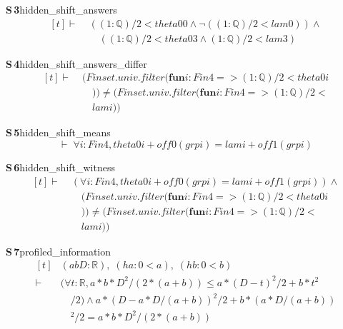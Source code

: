 \documentclass[conference]{IEEEtran}
\theoremstyle{definition}
\newcommand{\lean}[1]{\textsf{\footnotesize #1}}
\begin{document}
\noindent\textbf{S\,3}\quad\lean{hidden\_shift\_answers}
{\footnotesize\[ \begin{aligned}[t]
\vdash\;&((1:\mathbb{Q} )/2 < \mathit{theta0} 0 \wedge \neg ((1:\mathbb{Q} )/2 < \mathit{lam} 0)) \wedge\\
&\quad ((1:\mathbb{Q} )/2 < \mathit{theta0} 3 \wedge (1:\mathbb{Q} )/2 < \mathit{lam} 3)
\end{aligned} \]}

\noindent\textbf{S\,4}\quad\lean{hidden\_shift\_answers\_differ}
{\footnotesize\[ \begin{aligned}[t]
\vdash\;&(\mathit{Finset}.\mathit{univ}.\mathit{filter} (\mathbf{fun} \mathit{i} : \mathit{Fin} 4 => (1:\mathbb{Q} )/2 < \mathit{theta0} \mathit{i}\\
&\quad )) \neq (\mathit{Finset}.\mathit{univ}.\mathit{filter} (\mathbf{fun} \mathit{i} : \mathit{Fin} 4 => (1:\mathbb{Q} )/2 <\\
&\quad \mathit{lam} \mathit{i}))
\end{aligned} \]}

\noindent\textbf{S\,5}\quad\lean{hidden\_shift\_means}
{\footnotesize\[ \vdash\; \forall \mathit{i} : \mathit{Fin} 4, \mathit{theta0} \mathit{i} + \mathit{off0} (\mathit{grp} \mathit{i}) = \mathit{lam} \mathit{i} + \mathit{off1} (\mathit{grp} \mathit{i}) \]}

\noindent\textbf{S\,6}\quad\lean{hidden\_shift\_witness}
{\footnotesize\[ \begin{aligned}[t]
\vdash\;&(\forall \mathit{i} : \mathit{Fin} 4, \mathit{theta0} \mathit{i} + \mathit{off0} (\mathit{grp} \mathit{i}) = \mathit{lam} \mathit{i} + \mathit{off1} (\mathit{grp} \mathit{i})) \wedge\\
&\quad (\mathit{Finset}.\mathit{univ}.\mathit{filter} (\mathbf{fun} \mathit{i} : \mathit{Fin} 4 => (1:\mathbb{Q} )/2 < \mathit{theta0} \mathit{i}\\
&\quad )) \neq (\mathit{Finset}.\mathit{univ}.\mathit{filter} (\mathbf{fun} \mathit{i} : \mathit{Fin} 4 => (1:\mathbb{Q} )/2 <\\
&\quad \mathit{lam} \mathit{i}))
\end{aligned} \]}

\noindent\textbf{S\,7}\quad\lean{profiled\_information}
{\footnotesize\[ \begin{aligned}[t]
&(\mathit{a} \mathit{b} \mathit{D} : \mathbb{R} ),\; (\mathit{ha} : 0 < \mathit{a}),\; (\mathit{hb} : 0 < \mathit{b})\\
\vdash\;&(\forall \mathit{t} : \mathbb{R} , \mathit{a} * \mathit{b} * \mathit{D} ^{2} / (2 * (\mathit{a} + \mathit{b})) \leq \mathit{a} * (\mathit{D} - \mathit{t}) ^{2} / 2 + \mathit{b} * \mathit{t} ^{2}\\
&\quad / 2) \wedge \mathit{a} * (\mathit{D} - \mathit{a} * \mathit{D} / (\mathit{a} + \mathit{b})) ^{2} / 2 + \mathit{b} * (\mathit{a} * \mathit{D} / (\mathit{a} + \mathit{b}))\\
&\quad ^{2} / 2 = \mathit{a} * \mathit{b} * \mathit{D} ^{2} / (2 * (\mathit{a} + \mathit{b}))
\end{aligned} \]}
\end{document}
